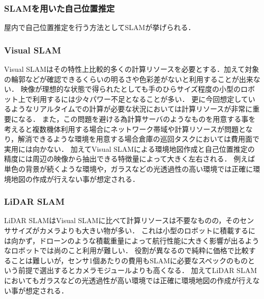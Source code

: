 \subsubsection{SLAMを用いた自己位置推定}
\label{slam_problem}
屋内で自己位置推定を行う方法としてSLAMが挙げられる．

\subsubsection{Visual SLAM}
Visual SLAMはその特性上比較的多くの計算リソースを必要とする．加えて対象の輪郭などが確認できるくらいの明るさや色彩差がないと利用することが出来ない．
映像が理想的な状態で得られたとしても手のひらサイズ程度の小型のロボット上で利用するには少々パワー不足となることが多い．
更に今回想定しているようなリアルタイムでの計算が必要な状況においては計算リソースが非常に重要になる．
また，この問題を避ける為計算サーバのようなものを用意する事を考えると複数機体利用する場合にネットワーク帯域や計算リソースが問題となり，解消できるような環境を用意する場合倉庫の巡回タスクにおいては費用面で実用には向かない．
加えてVisual SLAMによる環境地図作成と自己位置推定の精度には周辺の映像から抽出できる特徴量によって大きく左右される．
例えば単色の背景が続くような環境や，ガラスなどの光透過性の高い環境では正確に環境地図の作成が行えない事が想定される．

\subsubsection{LiDAR SLAM}
LiDAR SLAMはVisual SLAMに比べて計算リソースは不要なものの，そのセンササイズがカメラよりも大きい物が多い．
これは小型のロボットに積載するには向かず，ドローンのような積載重量によって航行性能に大きく影響が出るようなロボットでは尚のこと利用が難しい．
役割が異なるので純粋に価格で比較することは難しいが，センサ1個あたりの費用もSLAMに必要なスペックのものという前提で選出するとカメラモジュールよりも高くなる．
加えてLiDAR SLAMにおいてもガラスなどの光透過性が高い環境では正確に環境地図の作成が行えない事が想定される．